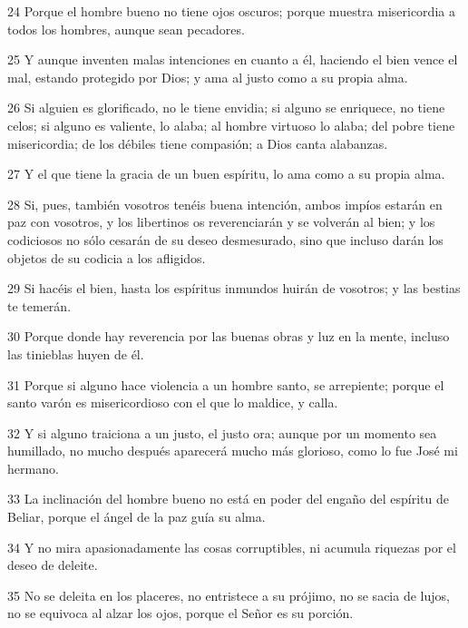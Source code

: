 \par 24 Porque el hombre bueno no tiene ojos oscuros; porque muestra misericordia a todos los hombres, aunque sean pecadores.

\par 25 Y aunque inventen malas intenciones en cuanto a él, haciendo el bien vence el mal, estando protegido por Dios; y ama al justo como a su propia alma.

\par 26 Si alguien es glorificado, no le tiene envidia; si alguno se enriquece, no tiene celos; si alguno es valiente, lo alaba; al hombre virtuoso lo alaba; del pobre tiene misericordia; de los débiles tiene compasión; a Dios canta alabanzas.

\par 27 Y el que tiene la gracia de un buen espíritu, lo ama como a su propia alma.

\par 28 Si, pues, también vosotros tenéis buena intención, ambos impíos estarán en paz con vosotros, y los libertinos os reverenciarán y se volverán al bien; y los codiciosos no sólo cesarán de su deseo desmesurado, sino que incluso darán los objetos de su codicia a los afligidos.

\par 29 Si hacéis el bien, hasta los espíritus inmundos huirán de vosotros; y las bestias te temerán.

\par 30 Porque donde hay reverencia por las buenas obras y luz en la mente, incluso las tinieblas huyen de él.

\par 31 Porque si alguno hace violencia a un hombre santo, se arrepiente; porque el santo varón es misericordioso con el que lo maldice, y calla.

\par 32 Y si alguno traiciona a un justo, el justo ora; aunque por un momento sea humillado, no mucho después aparecerá mucho más glorioso, como lo fue José mi hermano.

\par 33 La inclinación del hombre bueno no está en poder del engaño del espíritu de Beliar, porque el ángel de la paz guía su alma.

\par 34 Y no mira apasionadamente las cosas corruptibles, ni acumula riquezas por el deseo de deleite.

\par 35 No se deleita en los placeres, no entristece a su prójimo, no se sacia de lujos, no se equivoca al alzar los ojos, porque el Señor es su porción.

